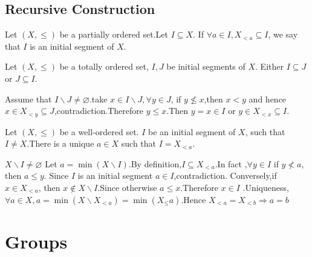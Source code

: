 \documentclass{book}
\numberwithin{equation}{section}
\begin{document}
\section{Recursive Construction}
\begin{definitionenv}
    Let $(X,\le)$ be a partially ordered set.Let $I\subseteq X$. If $\forall a\in I ,X_{<a}\subseteq I$, we say that $I$ is an initial segment of $X$. 
\end{definitionenv}
\begin{propositionenv}
    Let $(X,\le)$ be a totally ordered set, $I,J$ be initial segments of $X$. Either $I\subseteq J$ or $J\subseteq I$.
\end{propositionenv}
\begin{proofenv}
    Assume that $I\backslash J\not=\varnothing$.take $x\in I\backslash J,\forall y\in J$, if $y\not\le x $,then $x<y$ and hence $x\in X_{<y}\subseteq J$,contradiction.Therefore $y\le x$.Then $y=x\in I$ or $y\in X_{<x}\subseteq I$.
\end{proofenv}
\begin{propositionenv}
    Let $(X,\le)$ be a well-ordered set. $I$ be an initial segment of $X$, such that $I\not=X$.There is a unique $a\in X$ such that $I=X_{<a}$.
\end{propositionenv}
\begin{proofenv}
    $X\backslash I\not=\varnothing$ Let $a=\min (X\backslash I)$.By definition,$I\subseteq X_{<a}$.In fact ,$\forall y\in I$ if $y\not< a $, then $a\le y$.
    Since $I$ is an initial segment $a\in I$,contradiction.
    \newline
    Conversely,if $x\in X_{<a}$, then $x\notin X\backslash I$.Since otherwise $a\le x$.Therefore $x\in I$ .Uniqueness,$\forall a\in X,a=\min(X\backslash X_{<a})=\min(X_\leq a)$.Hence $X_{<a}=X_{<b}\Rightarrow a=b$
\end{proofenv}
\chapter{Groups}
\end{document}
